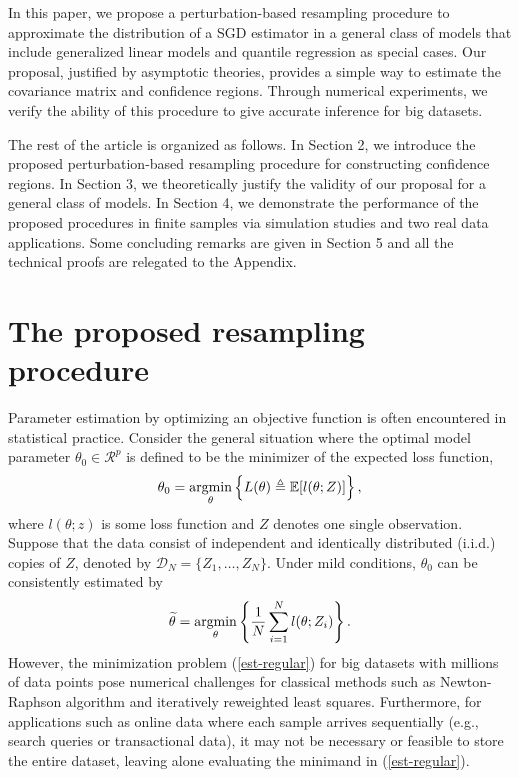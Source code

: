 \documentclass[12pt]{article}
\def\argmin{\mathop{\rm argmin}}
\def\wt{\widetilde}
\begin{document}
In this paper, we propose a perturbation-based resampling procedure to approximate the distribution of a SGD estimator in a general class of models that include generalized linear models and quantile regression as special cases. Our proposal, justified by asymptotic theories, provides a simple way to estimate the covariance matrix and confidence regions. Through numerical experiments, we verify the ability of this procedure to give accurate inference for big datasets.

The rest of the article is organized as follows. In Section 2,  we introduce the proposed perturbation-based resampling procedure for constructing confidence regions. In Section 3, we theoretically justify the validity of our proposal for a general class of models.  In Section 4, we demonstrate the performance of the proposed procedures in finite samples via simulation studies and two real data applications. Some concluding remarks are given in Section 5 and all the technical proofs are relegated to the Appendix.




\section{The proposed resampling procedure}

Parameter estimation by optimizing an objective function is often encountered  in statistical practice. Consider the general situation where the optimal model parameter $\theta_0\in \mathcal{R}^p$ is defined to be the minimizer of the expected loss function,
\begin{eqnarray}\label{theta-0}
{\theta}_0=\argmin_{\theta}\left\{L(\theta)\triangleq \mathbb{E}[l(\theta; Z)]\right\},
\end{eqnarray}
where $l(\theta; z)$ is some loss function and $Z$ denotes one single observation. Suppose that the data consist of independent and identically distributed (i.i.d.) copies of $Z$,  denoted by $\mathcal{D}_N=\{Z_1, \dots, Z_N\}$. Under mild conditions, $\theta_0$ can be consistently estimated by
 \begin{eqnarray}\label{est-regular}
 \wt{\theta}=\argmin_{\theta}\left\{\frac{1}{N}\sum_{i=1}^{N}l(\theta; Z_i)\right\}.
 \end{eqnarray}
However, the minimization problem (\ref{est-regular}) for big datasets with millions of data points pose numerical challenges for classical methods such as Newton-Raphson algorithm and iteratively reweighted least squares. Furthermore, for applications such as online data where each sample arrives sequentially (e.g., search queries or transactional data), it may not be necessary or feasible to store the entire dataset, leaving alone evaluating the minimand in (\ref{est-regular}).
\end{document}
